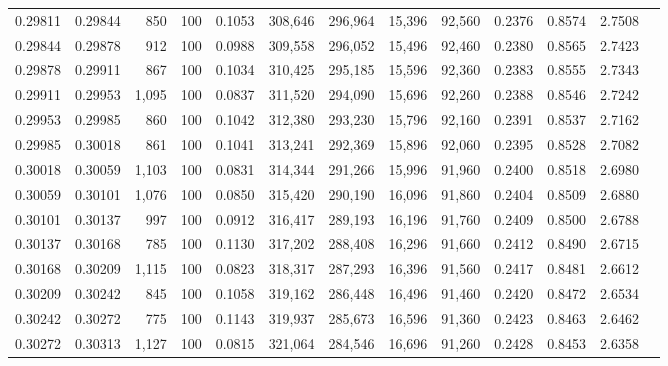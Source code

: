 \begin{tabular}{rrrrrrrrrrrrr}
0.29811 & 0.29844 &    850 & 100 &                                     0.1053 & 308,646 & 296,964 &  15,396 &  92,560 & 0.2376 & 0.8574 & 2.7508 \\
0.29844 & 0.29878 &    912 & 100 &                                     0.0988 & 309,558 & 296,052 &  15,496 &  92,460 & 0.2380 & 0.8565 & 2.7423 \\
0.29878 & 0.29911 &    867 & 100 &                                     0.1034 & 310,425 & 295,185 &  15,596 &  92,360 & 0.2383 & 0.8555 & 2.7343 \\
0.29911 & 0.29953 &  1,095 & 100 &                                     0.0837 & 311,520 & 294,090 &  15,696 &  92,260 & 0.2388 & 0.8546 & 2.7242 \\
0.29953 & 0.29985 &    860 & 100 &                                     0.1042 & 312,380 & 293,230 &  15,796 &  92,160 & 0.2391 & 0.8537 & 2.7162 \\
0.29985 & 0.30018 &    861 & 100 &                                     0.1041 & 313,241 & 292,369 &  15,896 &  92,060 & 0.2395 & 0.8528 & 2.7082 \\
0.30018 & 0.30059 &  1,103 & 100 &                                     0.0831 & 314,344 & 291,266 &  15,996 &  91,960 & 0.2400 & 0.8518 & 2.6980 \\
0.30059 & 0.30101 &  1,076 & 100 &                                     0.0850 & 315,420 & 290,190 &  16,096 &  91,860 & 0.2404 & 0.8509 & 2.6880 \\
0.30101 & 0.30137 &    997 & 100 &                                     0.0912 & 316,417 & 289,193 &  16,196 &  91,760 & 0.2409 & 0.8500 & 2.6788 \\
0.30137 & 0.30168 &    785 & 100 &                                     0.1130 & 317,202 & 288,408 &  16,296 &  91,660 & 0.2412 & 0.8490 & 2.6715 \\
0.30168 & 0.30209 &  1,115 & 100 &                                     0.0823 & 318,317 & 287,293 &  16,396 &  91,560 & 0.2417 & 0.8481 & 2.6612 \\
0.30209 & 0.30242 &    845 & 100 &                                     0.1058 & 319,162 & 286,448 &  16,496 &  91,460 & 0.2420 & 0.8472 & 2.6534 \\
0.30242 & 0.30272 &    775 & 100 &                                     0.1143 & 319,937 & 285,673 &  16,596 &  91,360 & 0.2423 & 0.8463 & 2.6462 \\
0.30272 & 0.30313 &  1,127 & 100 &                                     0.0815 & 321,064 & 284,546 &  16,696 &  91,260 & 0.2428 & 0.8453 & 2.6358 \\

\end{tabular}
